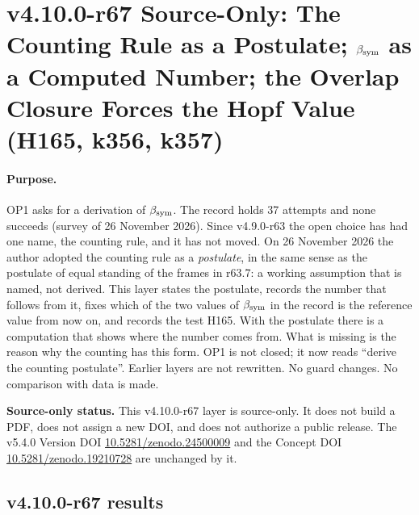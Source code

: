 
\clearpage
\section*{v4.10.0-r67 Source-Only: The Counting Rule as a Postulate; \texorpdfstring{\(\beta_{\rm sym}\)}{beta sym} as a Computed Number; the Overlap Closure Forces the Hopf Value (H165, k356, k357)}
\label{sec:v4100-r67-counting-postulate}

\paragraph{Purpose.}
OP1 asks for a derivation of \(\beta_{\rm sym}\).  The record holds 37 attempts and none succeeds (survey of 26 November 2026).  Since v4.9.0-r63
the open choice has had one name, the counting rule, and it has not moved.  On 26 November 2026 the author adopted the counting rule as a
\emph{postulate}, in the same sense as the postulate of equal standing of the frames in r63.7: a working assumption that is named, not derived.
This layer states the postulate, records the number that follows from it, fixes which of the two values of \(\beta_{\rm sym}\) in the record is
the reference value from now on, and records the test H165.  With the postulate there is a computation that shows where the number comes from.
What is missing is the reason why the counting has this form.  OP1 is not closed; it now reads ``derive the counting postulate''.  Earlier
layers are not rewritten.  No guard changes.  No comparison with data is made.

\noindent\textbf{Source-only status.}
This v4.10.0-r67 layer is source-only.  It does not build a PDF, does not assign a new DOI,
and does not authorize a public release.  The v5.4.0 Version DOI
\href{https://doi.org/10.5281/zenodo.24500009}{10.5281/zenodo.24500009} and the Concept DOI
\href{https://doi.org/10.5281/zenodo.19210728}{10.5281/zenodo.19210728} are unchanged by it.

\subsection*{v4.10.0-r67 results}
\label{subsec:v4100-r67-results}

